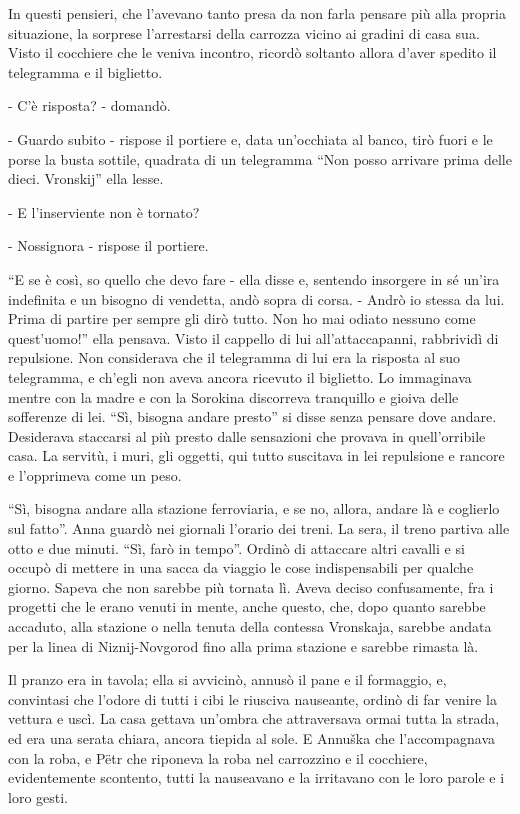 In questi pensieri, che l'avevano tanto presa da non farla pensare più alla propria situazione, la sorprese l'arrestarsi della carrozza vicino ai gradini di casa sua. Visto il cocchiere che le veniva incontro, ricordò soltanto allora d'aver spedito il telegramma e il biglietto. 

- C'è risposta? - domandò. 

- Guardo subito - rispose il portiere e, data un'occhiata al banco, tirò fuori e le porse la busta sottile, quadrata di un telegramma ``Non posso arrivare prima delle dieci. Vronskij'' ella lesse. 

- E l'inserviente non è tornato? 

- Nossignora - rispose il portiere. 

``E se è così, so quello che devo fare - ella disse e, sentendo insorgere in sé un'ira indefinita e un bisogno di vendetta, andò sopra di corsa. - Andrò io stessa da lui. Prima di partire per sempre gli dirò tutto. Non ho mai odiato nessuno come quest'uomo!'' ella pensava. Visto il cappello di lui all'attaccapanni, rabbrividì di repulsione. Non considerava che il telegramma di lui era la risposta al suo telegramma, e ch'egli non aveva ancora ricevuto il biglietto. Lo immaginava mentre con la madre e con la Sorokina discorreva tranquillo e gioiva delle sofferenze di lei. ``Sì, bisogna andare presto'' si disse senza pensare dove andare. Desiderava staccarsi al più presto dalle sensazioni che provava in quell'orribile casa. La servitù, i muri, gli oggetti, qui tutto suscitava in lei repulsione e rancore e l'opprimeva come un peso. 

``Sì, bisogna andare alla stazione ferroviaria, e se no, allora, andare là e coglierlo sul fatto''. Anna guardò nei giornali l'orario dei treni. La sera, il treno partiva alle otto e due minuti. ``Sì, farò in tempo''. Ordinò di attaccare altri cavalli e si occupò di mettere in una sacca da viaggio le cose indispensabili per qualche giorno. Sapeva che non sarebbe più tornata lì. Aveva deciso confusamente, fra i progetti che le erano venuti in mente, anche questo, che, dopo quanto sarebbe accaduto, alla stazione o nella tenuta della contessa Vronskaja, sarebbe andata per la linea di Niznij-Novgorod fino alla prima stazione e sarebbe rimasta là. 

Il pranzo era in tavola; ella si avvicinò, annusò il pane e il formaggio, e, convintasi che l'odore di tutti i cibi le riusciva nauseante, ordinò di far venire la vettura e uscì. La casa gettava un'ombra che attraversava ormai tutta la strada, ed era una serata chiara, ancora tiepida al sole. E Annuška che l'accompagnava con la roba, e Pëtr che riponeva la roba nel carrozzino e il cocchiere, evidentemente scontento, tutti la nauseavano e la irritavano con le loro parole e i loro gesti. 

